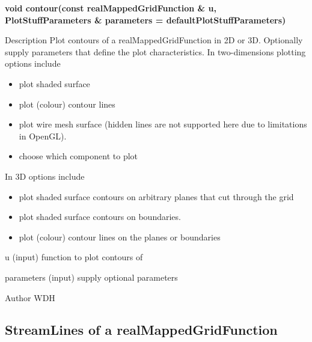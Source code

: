 \begin{flushleft} \textbf{%
\settowidth{\argIndent}{void contour(}%
void contour(const realMappedGridFunction \& u, \\ 
\hspace{\argIndent}         PlotStuffParameters \& parameters  = defaultPlotStuffParameters)
}\end{flushleft}
\begin{Lentry}

\item[Description] 
   Plot contours of a realMappedGridFunction in 2D or 3D.
  Optionally supply parameters that define the plot characteristics.
  In two-dimensions plotting options include
  \begin{itemize}
    \item plot shaded surface 
    \item plot (colour) contour lines
    \item plot wire mesh surface (hidden lines are not supported here due to
          limitations in OpenGL).
    \item choose which component to plot
  \end{itemize}
   In 3D options include
  \begin{itemize}
    \item plot shaded surface contours on arbitrary planes that cut through the grid
    \item plot shaded surface contours on boundaries.
    \item plot (colour) contour lines on the planes or boundaries
  \end{itemize}

\item[u (input)]  function to plot contours of
\item[parameters (input)]  supply optional parameters

\item[Author]  WDH

\end{Lentry}
\subsection{StreamLines of a realMappedGridFunction}
 
